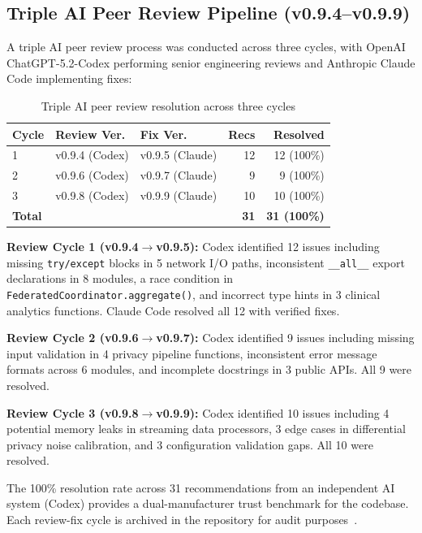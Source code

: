 \subsection{Triple AI Peer Review Pipeline (v0.9.4--v0.9.9)}
\label{sec:peer-review}

A triple AI peer review process was conducted across three cycles, with OpenAI ChatGPT-5.2-Codex performing senior engineering reviews and Anthropic Claude Code implementing fixes:

\begin{table}[H]
\centering
\caption{Triple AI peer review resolution across three cycles}
\label{tab:peer-review}
\small
\begin{tabular}{@{}lllrr@{}}
\toprule
\textbf{Cycle} & \textbf{Review Ver.} & \textbf{Fix Ver.} & \textbf{Recs} & \textbf{Resolved} \\
\midrule
1 & v0.9.4 (Codex) & v0.9.5 (Claude) & 12 & 12 (100\%) \\
2 & v0.9.6 (Codex) & v0.9.7 (Claude) & 9 & 9 (100\%) \\
3 & v0.9.8 (Codex) & v0.9.9 (Claude) & 10 & 10 (100\%) \\
\midrule
\textbf{Total} & & & \textbf{31} & \textbf{31 (100\%)} \\
\bottomrule
\end{tabular}
\end{table}

\textbf{Review Cycle 1 (v0.9.4$\rightarrow$v0.9.5):} Codex identified 12 issues including missing \texttt{try/except} blocks in 5 network I/O paths, inconsistent \texttt{\_\_all\_\_} export declarations in 8 modules, a race condition in \texttt{FederatedCoordinator.aggregate()}, and incorrect type hints in 3 clinical analytics functions. Claude Code resolved all 12 with verified fixes.

\textbf{Review Cycle 2 (v0.9.6$\rightarrow$v0.9.7):} Codex identified 9 issues including missing input validation in 4 privacy pipeline functions, inconsistent error message formats across 6 modules, and incomplete docstrings in 3 public APIs. All 9 were resolved.

\textbf{Review Cycle 3 (v0.9.8$\rightarrow$v0.9.9):} Codex identified 10 issues including 4 potential memory leaks in streaming data processors, 3 edge cases in differential privacy noise calibration, and 3 configuration validation gaps. All 10 were resolved.

The 100\% resolution rate across 31 recommendations from an independent AI system (Codex) provides a dual-manufacturer trust benchmark for the codebase. Each review-fix cycle is archived in the repository for audit purposes~\cite{kawchak2026peerreview}.

